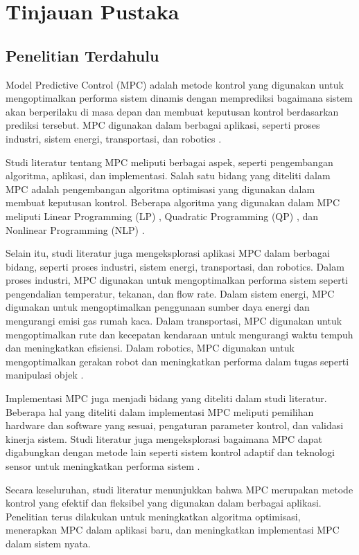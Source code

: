 \chapter{Tinjauan Pustaka}
\section{Penelitian Terdahulu} 
Model Predictive Control (MPC) adalah metode kontrol yang digunakan untuk mengoptimalkan performa sistem dinamis dengan memprediksi bagaimana sistem akan berperilaku di masa depan dan membuat keputusan kontrol berdasarkan prediksi tersebut. MPC digunakan dalam berbagai aplikasi, seperti proses industri, sistem energi, transportasi, dan robotics \cite{FORBES2015531}.

Studi literatur tentang MPC meliputi berbagai aspek, seperti pengembangan algoritma, aplikasi, dan implementasi. Salah satu bidang yang diteliti dalam MPC adalah pengembangan algoritma optimisasi yang digunakan dalam membuat keputusan kontrol. Beberapa algoritma yang digunakan dalam MPC meliputi Linear Programming (LP) \cite{Bemporad2002}, Quadratic Programming (QP) \cite{Kufoalor2016}, dan Nonlinear Programming (NLP) \cite{Mate2020}.

Selain itu, studi literatur juga mengeksplorasi aplikasi MPC dalam berbagai bidang, seperti proses industri, sistem energi, transportasi, dan robotics. Dalam proses industri, MPC digunakan untuk mengoptimalkan performa sistem seperti pengendalian temperatur, tekanan, dan flow rate. Dalam sistem energi, MPC digunakan untuk mengoptimalkan penggunaan sumber daya energi dan mengurangi emisi gas rumah kaca. Dalam transportasi, MPC digunakan untuk mengoptimalkan rute dan kecepatan kendaraan untuk mengurangi waktu tempuh dan meningkatkan efisiensi. Dalam robotics, MPC digunakan untuk mengoptimalkan gerakan robot dan meningkatkan performa dalam tugas seperti manipulasi objek \cite{Ju2012}.

Implementasi MPC juga menjadi bidang yang diteliti dalam studi literatur. Beberapa hal yang diteliti dalam implementasi MPC meliputi pemilihan hardware dan software yang sesuai, pengaturan parameter kontrol, dan validasi kinerja sistem. Studi literatur juga mengeksplorasi bagaimana MPC dapat digabungkan dengan metode lain seperti sistem kontrol adaptif dan teknologi sensor untuk meningkatkan performa sistem \cite{Lu2018}.

Secara keseluruhan, studi literatur menunjukkan bahwa MPC merupakan metode kontrol yang efektif dan fleksibel yang digunakan dalam berbagai aplikasi. Penelitian terus dilakukan untuk meningkatkan algoritma optimisasi, menerapkan MPC dalam aplikasi baru, dan meningkatkan implementasi MPC dalam sistem nyata.

